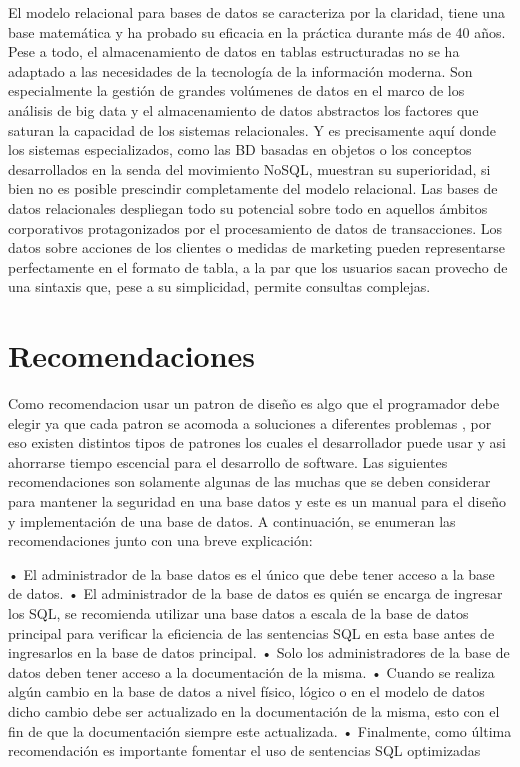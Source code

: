 \documentclass[twoside,twocolumn]{article}
\begin{document}
El modelo relacional para bases de datos se caracteriza por la claridad, tiene una base matemática y ha probado su eficacia en la práctica durante más de 40 años. Pese a todo, el almacenamiento de datos en tablas estructuradas no se ha adaptado a las necesidades de la tecnología de la información moderna.
Son especialmente la gestión de grandes volúmenes de datos en el marco de los análisis de big data y el almacenamiento de datos abstractos los factores que saturan la capacidad de los sistemas relacionales. Y es precisamente aquí donde los sistemas especializados, como las BD basadas en objetos o los conceptos desarrollados en la senda del movimiento NoSQL, muestran su superioridad, si bien no es posible prescindir completamente del modelo relacional. Las bases de datos relacionales despliegan todo su potencial sobre todo en aquellos ámbitos corporativos protagonizados por el procesamiento de datos de transacciones.
Los datos sobre acciones de los clientes o medidas de marketing pueden representarse perfectamente en el formato de tabla, a la par que los usuarios sacan provecho de una sintaxis que, pese a su simplicidad, permite consultas complejas.

\section{Recomendaciones}

Como recomendacion usar un patron de diseño es algo que el programador
debe elegir ya que cada patron se acomoda a soluciones a diferentes problemas 
, por eso existen distintos tipos de patrones los cuales el desarrollador puede usar y
 asi ahorrarse tiempo escencial para el desarrollo de software.
 Las siguientes recomendaciones son solamente algunas de las muchas que se deben considerar para mantener la seguridad en una base datos y este es un manual para el diseño y implementación de una base de datos. A continuación, se enumeran las recomendaciones junto con una breve explicación:

 •	El administrador de la base datos es el único que debe tener acceso a la base de datos.
 •	El administrador de la base de datos es quién se encarga de ingresar los SQL, se recomienda utilizar una base datos a escala de la base de datos principal para verificar la eficiencia de las sentencias SQL en esta base antes de ingresarlos en la base de datos principal.
 •	Solo los administradores de la base de datos deben tener acceso a la documentación de la misma.
 •	Cuando se realiza algún cambio en la base de datos a nivel físico, lógico o en el modelo de datos dicho cambio debe ser actualizado en la documentación de la misma, esto con el fin de que la documentación siempre este actualizada.
 •	Finalmente, como última recomendación es importante fomentar el uso de sentencias SQL optimizadas
\end{document}
